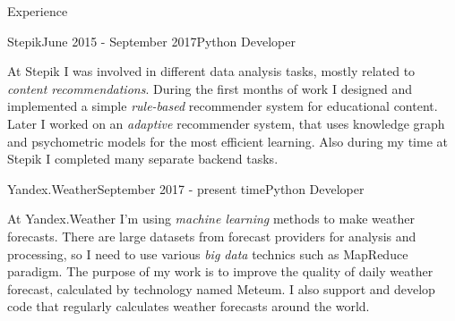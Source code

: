\documentclass{resume} %
\begin{document}
\begin{rSection}{Experience}



\begin{rSubsection}{Stepik}{June 2015 - September 2017}{Python Developer}{}
\item At Stepik I was involved in different data analysis tasks, mostly related to \textit{content recommendations}. During the first months of work I designed and implemented a simple \textit{rule-based} recommender system for educational content. Later I worked on an \textit{adaptive} recommender system, that uses knowledge graph and psychometric models for the most efficient learning. Also during my time at Stepik I completed many separate backend tasks.
\end{rSubsection}

\begin{rSubsection}{Yandex.Weather}{September 2017 - present time}{Python Developer}{}
\item At Yandex.Weather I'm using \textit{machine learning} methods to make weather forecasts. There are large datasets from forecast providers for analysis and processing, so I need to use various \textit{big data} technics such as MapReduce paradigm. The purpose of my work is to improve the quality of daily weather forecast, calculated by technology named Meteum. I also support and develop code that regularly calculates weather forecasts around the world.

\end{rSubsection}



\end{rSection}
\end{document}
